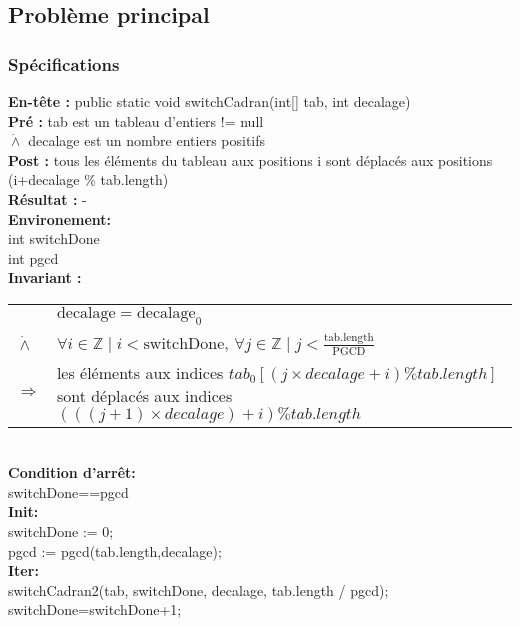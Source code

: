 \subsection{Problème principal}
\subsubsection*{Spécifications}
\noindent \textbf{En-tête :} public static void switchCadran(int[] tab, int decalage)\\
\noindent \textbf{Pré :} tab est un tableau d'entiers != null\\
\indent $\dot{\wedge}$ decalage est un nombre entiers positifs\\
\textbf{Post :} tous les éléments du tableau aux positions i sont déplacés aux positions (i+decalage \% tab.length)\\
\textbf{Résultat :} - \\

\noindent \textbf{Environement: }\\
int switchDone\\
int pgcd\\

\noindent \textbf{Invariant :}

\begin{tabular}{lp{14cm}}

& $\mathrm{decalage}=\mathrm{decalage}_{0}$ \\
$\dot{\wedge}$ & $\forall i \in \mathbb{Z} \mid i < \mathrm{switchDone} $, $\forall j \in \mathbb{Z} \mid j < \frac{\mathrm{tab.length}}{\mathrm{PGCD}}$ \\
$\Rightarrow$ & les éléments aux indices $tab_{0}[(j \times decalage + i) \% tab.length]$ sont déplacés aux indices $(((j+1)\times decalage)+i) \% tab.length$ \\
\end{tabular}\\

\noindent \textbf{Condition d'arrêt: }\\
switchDone==pgcd \\

\noindent \textbf{Init: }\\
switchDone := 0;\\
pgcd := pgcd(tab.length,decalage); \\

\noindent \textbf{Iter: } \\
switchCadran2(tab, switchDone, decalage, tab.length / pgcd);
switchDone=switchDone+1;

